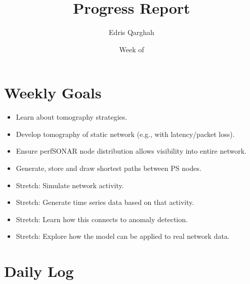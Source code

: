 \documentclass{weeklyreport}
\title{Progress Report}
\author{Edris Qarghah}
\date{Week of \DTMusedate{reportdate}}
\begin{document}
\maketitle

\newpage

\section*{Weekly Goals}


\begin{itemize}
	\item Learn about tomography strategies.
	\item Develop tomography of static network (e.g., with latency/packet loss).
	\item Ensure perfSONAR node distribution allows visibility into entire network.
	\item Generate, store and draw shortest paths between PS nodes.
	\item Stretch: Simulate network activity.
	\item Stretch: Generate time series data based on that activity.
	\item Stretch: Learn how this connects to anomaly detection.
	\item Stretch: Explore how the model can be applied to real network data.
\end{itemize}

\section*{Daily Log}

\subsection*{}
\end{document}
